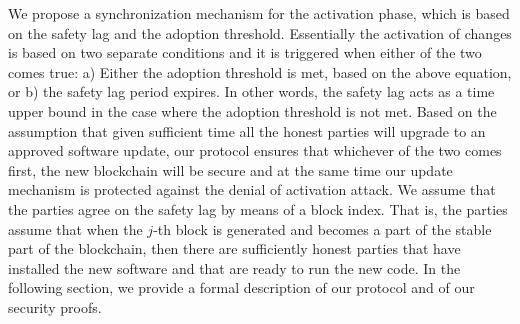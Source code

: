 
We propose a synchronization mechanism for the activation phase, which is based on the safety lag and the adoption threshold. Essentially the activation of changes is based on two separate conditions and it is triggered when either of the two comes true: a) Either the adoption threshold is met, based on the above equation, or b) the safety lag period expires. In other words, the safety lag acts as a time upper bound in the case where the adoption threshold is not met. Based on the assumption that given sufficient time all the honest parties will upgrade to an approved software update, our protocol ensures that whichever of the two comes first, the new blockchain will be secure and at the same time our update mechanism is protected against the denial of activation attack. 
We assume that the parties agree on the safety lag by means of a block index. That is, the parties assume that when the $j$-th block 
is generated and becomes a part of the stable part of the blockchain, then there are sufficiently honest parties that have installed the new software and that are ready to run the new code. 
In the following section, we provide a formal description of our protocol and of our security proofs. 





